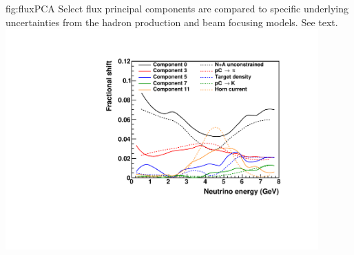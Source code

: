 \begin{dunefigure}{fig:fluxPCA}
{Select flux principal components are compared to specific underlying uncertainties from the hadron production and beam focusing models. See text. }
    \includegraphics[width=0.9\textwidth]{graphics/Flux_Unc_PCA.pdf}
\end{dunefigure}



